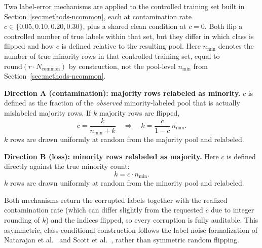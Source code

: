 Two label-error mechanisms are applied to the controlled training set built
in Section~\ref{sec:methods-ncommon}, each at contamination rate $c \in
\{0.05, 0.10, 0.20, 0.30\}$, plus a shared clean condition at $c{=}0$. Both
flip a controlled number of true labels within that set, but they differ in
which class is flipped and how $c$ is defined relative to the resulting
pool. Here $n_{\min}$ denotes the number of true minority rows in that
controlled training set, equal to $\text{round}(r \cdot N_{\text{common}})$
by construction, not the pool-level $n_{\min}$ from
Section~\ref{sec:methods-ncommon}.

\textbf{Direction A (contamination): majority rows relabeled as minority.}
$c$ is defined as the fraction of the \emph{observed} minority-labeled pool
that is actually mislabeled majority rows. If $k$ majority rows are
flipped,
\begin{equation}
c = \frac{k}{n_{\min} + k}
\quad\Longrightarrow\quad
k = \frac{c}{1-c}\, n_{\min}.
\label{eq:directionA}
\end{equation}
$k$ rows are drawn uniformly at random from the majority pool and relabeled.

\textbf{Direction B (loss): minority rows relabeled as majority.}
Here $c$ is defined directly against the true minority count:
\begin{equation}
k = c \cdot n_{\min}.
\label{eq:directionB}
\end{equation}
$k$ rows are drawn uniformly at random from the minority pool and relabeled.

Both mechanisms return the corrupted labels together with the realized
contamination rate (which can differ slightly from the requested $c$ due to
integer rounding of $k$) and the indices flipped, so every corruption is
fully auditable. This asymmetric, class-conditional construction follows the
label-noise formalization of Natarajan et al.~\cite{natarajan2013noisylabels}
and Scott et al.~\cite{scott2013asymmetricnoise}, rather than symmetric random
flipping.

